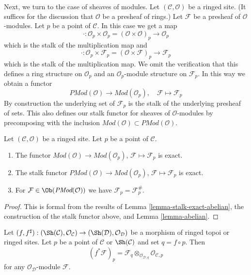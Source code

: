 \noindent
Next, we turn to the case of sheaves of modules.
Let $(\mathcal{C}, \mathcal{O})$ be a ringed site.
(It suffices for the discussion that $\mathcal{O}$ be a presheaf
of rings.)
Let $\mathcal{F}$ be a presheaf of $\mathcal{O}$-modules.
Let $p$ be a point of $\mathcal{C}$. In this case we get a map
$$
\cdot :
\mathcal{O}_p \times \mathcal{O}_p
=
(\mathcal{O} \times \mathcal{O})_p
\longrightarrow
\mathcal{O}_p
$$
which is the stalk of the multiplication map and
$$
\cdot :
\mathcal{O}_p \times \mathcal{F}_p
=
(\mathcal{O} \times \mathcal{F})_p
\longrightarrow
\mathcal{F}_p
$$
which is the stalk of the multiplication map. We omit the verification
that this defines a ring structure on $\mathcal{O}_p$ and an
$\mathcal{O}_p$-module structure on $\mathcal{F}_p$.
In this way we obtain a functor
$$
\textit{PMod}(\mathcal{O}) \longrightarrow \textit{Mod}(\mathcal{O}_p), \quad
\mathcal{F} \longmapsto \mathcal{F}_p
$$
By construction the underlying set of $\mathcal{F}_p$ is the stalk of the
underlying presheaf of sets. This also defines our stalk functor for
sheaves of $\mathcal{O}$-modules by precomposing with the inclusion
$\textit{Mod}(\mathcal{O}) \subset \textit{PMod}(\mathcal{O})$.

\begin{lemma}
\label{lemma-stalk-exact-modules}
Let $(\mathcal{C}, \mathcal{O})$ be a ringed site.
Let $p$ be a point of $\mathcal{C}$.
\begin{enumerate}
\item The functor
$\textit{Mod}(\mathcal{O}) \to \textit{Mod}(\mathcal{O}_p)$,
$\mathcal{F} \mapsto \mathcal{F}_p$ is exact.
\item The stalk functor
$\textit{PMod}(\mathcal{O}) \to \textit{Mod}(\mathcal{O}_p)$,
$\mathcal{F} \mapsto \mathcal{F}_p$
is exact.
\item For $\mathcal{F} \in \Ob(\textit{PMod}(\mathcal{O}))$
we have $\mathcal{F}_p = \mathcal{F}^\#_p$.
\end{enumerate}
\end{lemma}

\begin{proof}
This is formal from the results of
Lemma \ref{lemma-stalk-exact-abelian},
the construction of the stalk functor above, and
Lemma \ref{lemma-abelian}.
\end{proof}

\begin{lemma}
\label{lemma-pullback-stalk}
Let
$(f, f^\sharp) :
(\Sh(\mathcal{C}), \mathcal{O}_\mathcal{C})
\to
(\Sh(\mathcal{D}), \mathcal{O}_\mathcal{D})$
be a morphism of ringed topoi or ringed sites.
Let $p$ be a point of $\mathcal{C}$ or $\Sh(\mathcal{C})$
and set $q = f \circ p$. Then
$$
(f^*\mathcal{F})_p =
\mathcal{F}_q \otimes_{\mathcal{O}_{\mathcal{D}, q}}
\mathcal{O}_{\mathcal{C}, p}
$$
for any $\mathcal{O}_\mathcal{D}$-module $\mathcal{F}$.
\end{lemma}

